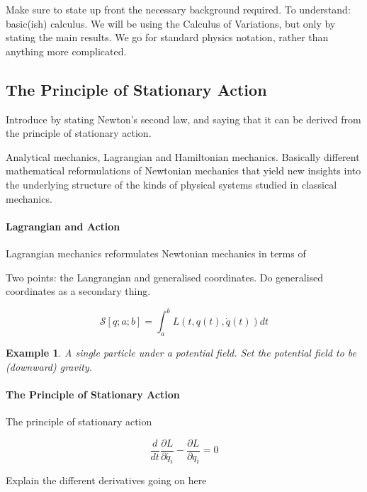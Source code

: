 \documentclass[preprint]{sigplanconf}
\theoremstyle{examplestyle}
\newtheorem{example}{Example}
\begin{document}
Make sure to state up front the necessary background required. To
understand: basic(ish) calculus. We will be using the Calculus of
Variations, but only by stating the main results. We go for standard
physics notation, rather than anything more complicated.

\subsection{The Principle of Stationary Action}

Introduce by stating Newton's second law, and saying that it can be
derived from the principle of stationary action.

Analytical mechanics, Lagrangian and Hamiltonian mechanics. Basically
different mathematical reformulations of Newtonian mechanics that
yield new insights into the underlying structure of the kinds of
physical systems studied in classical mechanics. 

\paragraph{Lagrangian and Action}

Lagrangian mechanics reformulates Newtonian mechanics in terms of 

Two points: the Langrangian and generalised coordinates. Do
generalised coordinates as a secondary thing.

\begin{displaymath}
  \mathcal{S}[q;a;b] = \int_a^b L(t,q(t),\dot{q}(t)) \mathit{dt}
\end{displaymath}

\begin{example}
  A single particle under a potential field. Set the potential field
  to be (downward) gravity.
\end{example}

\paragraph{The Principle of Stationary Action}

The principle of stationary action 

\begin{displaymath}
  \frac{d}{dt}\frac{\partial L}{\partial \dot{q_i}} - \frac{\partial L}{\partial q_i} = 0
\end{displaymath}

Explain the different derivatives going on here
\end{document}
